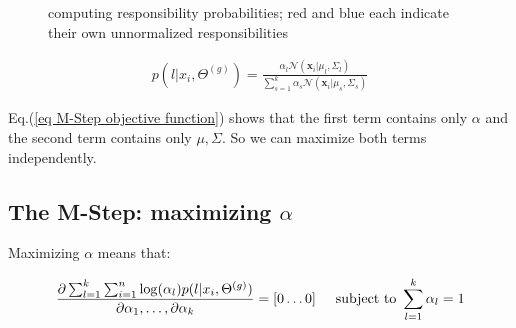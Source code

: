 \documentclass{article}
\def\x{{\mathbf x}}
\def\N{\mathcal{N}}
\begin{document}
\begin{figure}[H]
\begin{center}\label{fig:responsibilities}
\caption{computing responsibility probabilities; red and blue each indicate their own unnormalized responsibilities}
\end{center}
\end{figure}


\begin{equation}\begin{split}
p (l | x_i, \Theta^{(g)}) = \frac{\alpha_l \N(\x_i | \mu_l, \Sigma_l) }{\sum_{s=1}^k \alpha_s \N(\x_i| \mu_s, \Sigma_s) }
\end{split}\end{equation}


Eq.(\ref{eq M-Step objective function}) shows that the first term contains only $\alpha$ and the second term contains only $\mu, \Sigma$. So we can maximize both terms independently.


\subsection{The M-Step: maximizing $\alpha$}

Maximizing $\alpha$ means that:

\begin{equation}
\begin{split}
\frac{\partial \sum_{l=1}^k  \sum_{i=1}^{n}  \log ( \alpha_{l}) p(l|x_i,\Theta^{(g)}) }
{\partial \alpha_1, \dots, \partial \alpha_k} = [ 0 \dots 0 ] \hspace{5 mm} \text{subject to } \sum_{l=1}^k \alpha_l = 1\\
\end{split}
\end{equation}
\end{document}
